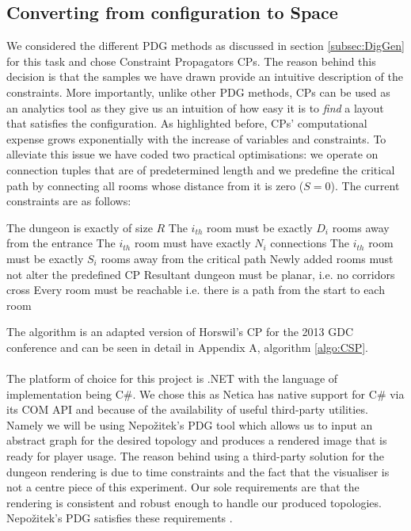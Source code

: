 \documentclass{UoYCSproject}
\begin{document}
\subsection{Converting from configuration to Space}
\label{subsec:CSP}
 We considered the different PDG methods as discussed in section \ref{subsec:DigGen} for this task and chose Constraint Propagators CPs. The reason behind this decision is that the samples we have drawn provide an intuitive description of the constraints. More importantly, unlike other PDG methods, CPs can be used as an analytics tool as they give us an intuition of how easy it is to \textit{find} a layout that satisfies the configuration. As highlighted before, CPs' computational expense grows exponentially with the increase of variables and constraints. To alleviate this issue we have coded two practical optimisations: we operate on connection tuples that are of predetermined length and we predefine the critical path by connecting all rooms whose distance from it is zero (\(S = 0\)). The current constraints are as follows:
\begin{outline}[enumerate]
  \1 The dungeon is exactly of size \(R\)
  \1 The \(i_{th}\) room must be exactly \(D_i\) rooms away from the entrance
  \1 The \(i_{th}\) room must have exactly \(N_i\) connections 
  \1 The \(i_{th}\) room must be exactly \(S_i\) rooms away from the critical path
  \1 Newly added rooms must not alter the predefined CP
  \1 Resultant dungeon must be planar, i.e. no corridors cross
  \1 Every room must be reachable i.e. there is a path from the start to each room
\end{outline}

The algorithm is an adapted version of Horswil's CP for the 2013 GDC conference \parencite{HorswillCPInAWeekend} and can be seen in detail in Appendix A, algorithm \ref{algo:CSP}.

\paragraph{}
The platform of choice for this project is .NET with the language of implementation being C\#. We chose this as Netica has native support for C\# via its COM API and because of the availability of useful third-party utilities. Namely we will be using Nepo\v{z}itek's PDG tool \parencite{levelGenerator} which allows us to input an abstract graph for the desired topology and produces a rendered image that is ready for player usage. The reason behind using a third-party solution for the dungeon rendering is due to time constraints and the fact that the visualiser is not a centre piece of this experiment. Our sole requirements are that the rendering is consistent and robust enough to handle our produced topologies. Nepo\v{z}itek's PDG satisfies these requirements \parencite{Nepozitek2018FASTCT}.
\end{document}
